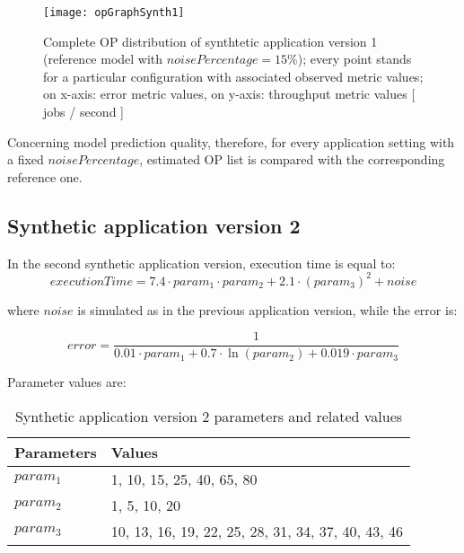 \begin{figure}[H]

    \centering
    \texttt{[image: opGraphSynth1]}
    \caption[Complete OP distribution of synthtetic application version 1]{Complete OP distribution of synthtetic application version 1 (reference model with $noisePercentage = 15\%$); every point stands for a particular configuration with associated observed metric values; on x-axis: error metric values, on y-axis: throughput metric values [ jobs / second ]}
    \label{fig::opListSynth1}
    
\end{figure}

Concerning model prediction quality, therefore, for every application setting with a fixed $noisePercentage$, estimated OP list is compared with the corresponding reference one.


\subsection{Synthetic application version 2}

In the second synthetic application version, execution time is equal to:
\[
executionTime = 7.4 \cdot param_1 \cdot param_2 + 2.1 \cdot (param_3)^2 + noise
\]

where $noise$ is simulated as in the previous application version, while the error is:

\[
error = \dfrac{1}{0.01 \cdot param_1 + 0.7 \cdot \ln{(param_2)} + 0.019 \cdot param_3}
\]

Parameter values are:

\begin{table}[H]

    \centering

    \begin{tabular}{ll}
    
        \toprule
        Parameters & Values \\
        \midrule
        $param_1$ & 1, 10, 15, 25, 40, 65, 80 \\
        $param_2$ & 1, 5, 10, 20 \\
        $param_3$ & 10, 13, 16, 19, 22, 25, 28, 31, 34, 37, 40, 43, 46 \\
        \bottomrule 
    
    \end{tabular}

    \caption{Synthetic application version 2 parameters and related values}

\end{table}

